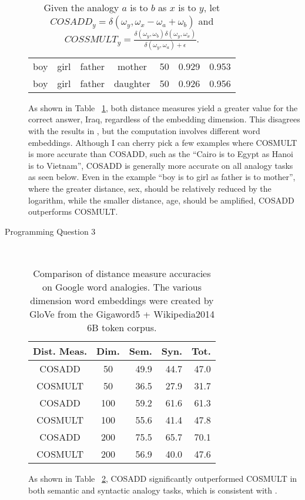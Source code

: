 \documentclass{article}
\newcommand*{\0}{\Vec{0}}
\newcommand*{\de}{\delta}
\newcommand*{\om}{\omega}
\newcommand*{\ep}{\epsilon}
\begin{document}
\begin{description}
\begin{table}[H]
\begin{tabular}{|ccccc|rr|}
				\hline
				boy & girl & father & mother & 50 & 0.929 & 0.953 \\
				boy & girl & father & daughter & 50 & 0.926 & 0.956 \\
				\hline
			\end{tabular}
			\caption{
				Given the analogy $a$ is to $b$ as $x$ is to $y$,
				let $COSADD_y = \de(\om_y,\om_x-\om_a+\om_b)$ and
				$COSSMULT_y = \frac{\de(\om_y,\om_b)\de(\om_y,\om_x)}{\de(\om_y,\om_a)+\ep}$.
			}
			\label{tab:comp}
		\end{table}
		As shown in Table ~\ref{tab:comp}, both distance measures yield a greater value for the correct answer, Iraq, regardless of the embedding dimension.
		This disagrees with the results in \cite{levy}, but the computation involves different word embeddings.
		Although I can cherry pick a few examples where COSMULT is more accurate than COSADD, such as the ``Cairo is to Egypt as Hanoi is to Vietnam'', COSADD is generally more accurate on all analogy tasks as seen below.
		Even in the example ``boy is to girl as father is to mother'', where the greater distance, sex, should be relatively reduced by the logarithm, while the smaller distance, age, should be amplified, COSADD outperforms COSMULT.
	\item[Programming Question 3] \hfill \\
		\begin{table}[H]
			\centering
			\begin{tabular}{|cc|rrr|}
				\hline
				Dist. Meas. & Dim. & Sem. & Syn. & Tot. \\
				\hline
				COSADD & 50 & 49.9 & 44.7 & 47.0 \\
				COSMULT & 50 & 36.5 & 27.9 & 31.7 \\
				\hline
				COSADD & 100 & 59.2 & 61.6 & 61.3 \\
				COSMULT & 100 & 55.6 & 41.4 & 47.8 \\
				\hline
				COSADD & 200 & 75.5 & 65.7 & 70.1 \\
				COSMULT & 200 & 56.9 & 40.0 & 47.6 \\
				\hline
			\end{tabular}
			\caption{Comparison of distance measure accuracies on Google word analogies. The various dimension word embeddings were created by GloVe from the Gigaword5 + Wikipedia2014 6B token corpus.}
			\label{tab:google}
		\end{table}
		As shown in Table ~\ref{tab:google}, COSADD significantly outperformed COSMULT in both semantic and syntactic analogy tasks, which is consistent with \cite{glove}.

\end{description}
\end{document}
